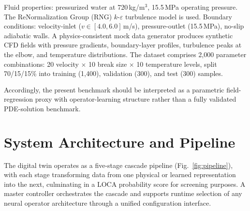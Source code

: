\documentclass[journal]{IEEEtran}
\begin{document}
Fluid properties: pressurized water at 720\,kg/m$^3$, 15.5\,MPa operating pressure. The ReNormalization Group (RNG) $k$-$\varepsilon$ turbulence model is used. Boundary conditions: velocity-inlet ($v \in [4.0, 6.0]$\,m/s), pressure-outlet (15.5\,MPa), no-slip adiabatic walls. A physics-consistent mock data generator produces synthetic CFD fields with pressure gradients, boundary-layer profiles, turbulence peaks at the elbow, and temperature distributions. The dataset comprises 2,000 parameter combinations: 20 velocity $\times$ 10 break size $\times$ 10 temperature levels, split 70/15/15\% into training (1,400), validation (300), and test (300) samples.

Accordingly, the present benchmark should be interpreted as a parametric field-regression proxy with operator-learning structure rather than a fully validated PDE-solution benchmark.

\section{System Architecture and Pipeline}
\label{sec:system}

The digital twin operates as a five-stage cascade pipeline (Fig.~\ref{fig:pipeline}), with each stage transforming data from one physical or learned representation into the next, culminating in a LOCA probability score for screening purposes. A master controller orchestrates the cascade and supports runtime selection of any neural operator architecture through a unified configuration interface.
\end{document}
